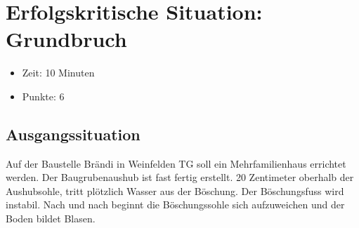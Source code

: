 




\pagestyle{headandfoot}
\firstpageheadrule
\runningheadrule
\firstpageheader{\fontsize{9pt}{2pt}\selectfont\fach}{}{\fontsize{9pt}{2pt}\selectfont\dozent \\ \blattname}
\runningheader{\fontsize{9pt}{2pt}\selectfont\fach}{}{\fontsize{9pt}{2pt}\selectfont\dozent \\ \blattname}

\usepackage{siunitx}


\newcommand{\blattname}{Erfolgskritische Situation: Grundbruch}




\section*{\blattname}
\begin{itemize}[noitemsep]
    \item Zeit: 10 Minuten
    \item Punkte: 6
\end{itemize}

\subsection*{Ausgangssituation}
Auf der Baustelle Brändi in Weinfelden TG soll ein Mehrfamilienhaus errichtet werden. Der Baugrubenaushub ist fast fertig erstellt. 20 Zentimeter oberhalb der Aushubsohle, tritt plötzlich Wasser aus der Böschung. Der Böschungsfuss wird instabil. Nach und nach beginnt die Böschungssohle sich aufzuweichen und der Boden bildet Blasen.

